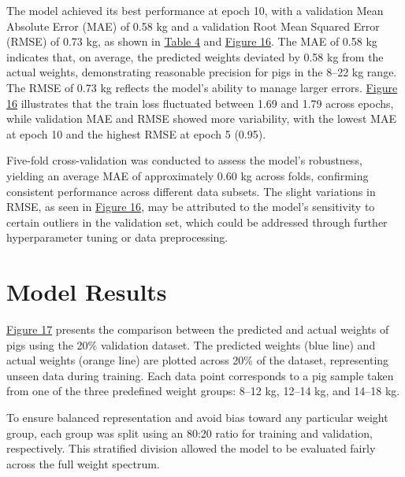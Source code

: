 The model achieved its best performance at epoch 10, with a validation Mean Absolute Error (MAE) of 0.58 kg and a validation Root Mean Squared Error (RMSE) of 0.73 kg, as shown in \hyperref[tab:Performance Metrics of the Hybrid LightGBM-CNN Model Across Epochs]{Table 4} and \hyperref[fig:Epoch]{Figure 16}. The MAE of 0.58 kg indicates that, on average, the predicted weights deviated by 0.58 kg from the actual weights, demonstrating reasonable precision for pigs in the 8–22 kg range. The RMSE of 0.73 kg reflects the model’s ability to manage larger errors. \hyperref[fig:Epoch]{Figure 16} illustrates that the train loss fluctuated between 1.69 and 1.79 across epochs, while validation MAE and RMSE showed more variability, with the lowest MAE at epoch 10 and the highest RMSE at epoch 5 (0.95).

Five-fold cross-validation was conducted to assess the model’s robustness, yielding an average MAE of approximately 0.60 kg across folds, confirming consistent performance across different data subsets. The slight variations in RMSE, as seen in \hyperref[fig:Epoch]{Figure 16}, may be attributed to the model’s sensitivity to certain outliers in the validation set, which could be addressed through further hyperparameter tuning or data preprocessing.

\section{Model Results}

\hyperref[fig:Predicted vs Actual Weights]{Figure 17} presents the comparison between the predicted and actual weights of pigs using the 20\% validation dataset. The predicted weights (blue line) and actual weights (orange line) are plotted across 20\% of the dataset, representing unseen data during training. Each data point corresponds to a pig sample taken from one of the three predefined weight groups: 8–12 kg, 12–14 kg, and 14–18 kg.

To ensure balanced representation and avoid bias toward any particular weight group, each group was split using an 80:20 ratio for training and validation, respectively. This stratified division allowed the model to be evaluated fairly across the full weight spectrum.

\newpage

